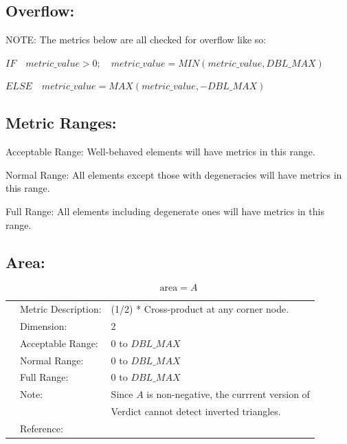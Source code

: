 \documentclass[12pt]{article}
\begin{document}
\subsection*{Overflow:}

\begin{flushleft}
NOTE:  The metrics below are all checked for overflow like so:
\end{flushleft}

\begin{flushleft}
${IF \quad metric\_value > 0;  \quad metric\_value = MIN( metric\_value, DBL\_MAX )}$
\end{flushleft}
 
\begin{flushleft}
${ELSE \quad metric\_value = MAX( metric\_value, -DBL\_MAX )}$
\end{flushleft}

\subsection*{Metric Ranges:}

\begin{flushleft}
Acceptable Range: Well-behaved elements will have metrics in this range.
\end{flushleft}
\begin{flushleft}
Normal Range:     All elements except those with degeneracies will have  \newline
                  metrics in this range.
\end{flushleft}
\begin{flushleft}
Full Range:       All elements including degenerate ones will have metrics \newline
                  in this range. 
\end{flushleft}

\subsection*{Area:}

\begin{displaymath}
\textrm{area} = A 
\end{displaymath}

\begin{tabular}{lll}
& Metric Description:  & (1/2) * Cross-product at any corner node. \\
& Dimension:           & 2                              \\ 
& Acceptable Range:    & 0 to $DBL\_MAX$                      \\ 
& Normal Range:        & 0 to $DBL\_MAX$                      \\ 
& Full Range:          & 0 to $DBL\_MAX$                       \\ 
& Note:                & Since $A$ is non-negative, the currrent version of \\
&                      & Verdict cannot detect inverted triangles. \\
& Reference:           & \cite{three}                     \\ 
\end{tabular} 
\end{document}
